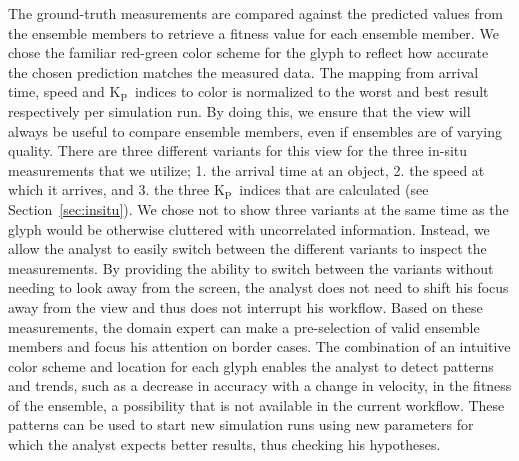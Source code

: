 \documentclass[journal]{vgtc}                %
\newcommand{\kpIndex}{$\textrm{K}_\textrm{P}$}
\begin{document}
The ground-truth measurements are compared against the predicted values from the ensemble members to retrieve a fitness value for each ensemble member. We chose the familiar red-green color scheme for the glyph to reflect how accurate the chosen prediction matches the measured data. The mapping from arrival time, speed and \kpIndex\ indices to color is normalized to the worst and best result respectively per simulation run. By doing this, we ensure that the view will always be useful to compare ensemble members, even if ensembles are of varying quality. There are three different variants for this view for the three in-situ measurements that we utilize; 1. the arrival time at an object, 2. the speed at which it arrives, and 3. the three \kpIndex\ indices that are calculated (see Section~\ref{sec:insitu}). We chose not to show three variants at the same time as the glyph would be otherwise cluttered with uncorrelated information. Instead, we allow the analyst to easily switch between the different variants to inspect the measurements. By providing the ability to switch between the variants without needing to look away from the screen, the analyst does not need to shift his focus away from the view and thus does not interrupt his workflow. Based on these measurements, the domain expert can make a pre-selection of valid ensemble members and focus his attention on border cases. The combination of an intuitive color scheme and location for each glyph enables the analyst to detect patterns and trends, such as a decrease in accuracy with a change in velocity, in the fitness of the ensemble, a possibility that is not available in the current workflow. These patterns can be used to start new simulation runs using new parameters for which the analyst expects better results, thus checking his hypotheses.
\end{document}
